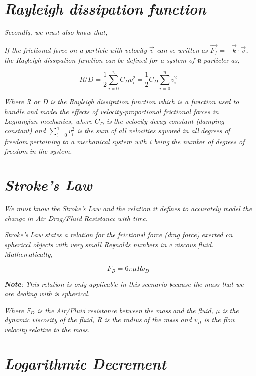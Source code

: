 \section{\textit{Rayleigh dissipation function}}
            
    \textit{Secondly, we must also know that,}
            
    \textit{If the frictional force on a particle with velocity $\vec{v}$ can be written as $\vec{F_f} = -\vec{k}\cdot\vec{v}$, the Rayleigh dissipation function can be defined for a system of \textbf{n} particles as,}
            
        $$R/D = \frac{1}{2} \sum_{i=0}^n C_Dv^2_i = \frac{1}{2}C_D \sum_{i=0}^n v^2_i$$
            
    \textit{Where R or D is the Rayleigh dissipation function which is a function used to handle and model the effects of velocity-proportional frictional forces in Lagrangian mechanics, where $C_D$ is the velocity decay constant (damping constant) and $\sum_{i=0}^n v^2_i$ is the sum of all velocities squared in all degrees of freedom pertaining to a mechanical system with i being the number of degrees of freedom in the system.}
            
\section{\textit{Stroke's Law}}\label{slaw}
            
    \textit{We must know the Stroke's Law and the relation it defines to accurately model the change in Air Drag/Fluid Resistance with time.}
            
    \textit{Stroke's Law states a relation for the frictional force (drag force) exerted on spherical objects with very small Reynolds numbers in a viscous fluid. Mathematically,}
            
        $$F_D = 6\pi\mu Rv_D$$
            
    \textit{\textbf{Note}: This relation is only applicable in this scenario because the mass that we are dealing with is spherical.}
            
    \textit{Where $F_D$ is the Air/Fluid resistance between the mass and the fluid, $\mu$ is the dynamic viscosity of the fluid, R is the radius of the mass and $v_D$ is the flow velocity relative to the mass.}
            
\section{\textit{Logarithmic Decrement}}
            
